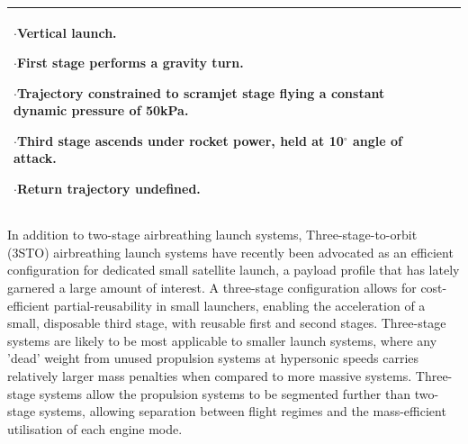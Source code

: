 {\begin{landscape}
\begin{xltabular}{\linewidth}{|X|X|X|}
	
	$\cdot$Vertical launch.
	
	$\cdot$First stage performs a gravity turn. 
	
	$\cdot$Trajectory constrained to scramjet stage flying a constant dynamic pressure of 50kPa. 
	
	$\cdot$Third stage ascends under rocket power, held at 10$^\circ$ angle of attack. 
	
	$\cdot$Return trajectory undefined. 
	
	\\
	\hline
\end{xltabular}

\end{landscape}
}

In addition to two-stage airbreathing launch systems, Three-stage-to-orbit (3STO) airbreathing launch systems have recently been advocated as an efficient configuration for dedicated small satellite launch, a payload profile that has lately garnered a large amount of interest. A three-stage configuration allows for cost-efficient partial-reusability in small launchers, enabling the acceleration of a small, disposable third stage, with reusable first and second stages. 
Three-stage systems are likely to be most applicable to smaller launch systems, where any 'dead' weight from unused propulsion systems at hypersonic speeds carries relatively larger mass penalties when compared to more massive systems. Three-stage systems allow the propulsion systems to be segmented further than two-stage systems, allowing separation between flight regimes and the mass-efficient utilisation of each engine mode\cite{XXX}.

